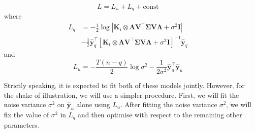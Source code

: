 \begin{equation} \label{eq:LikelihoodParts}
L = L_u + L_q + \text{const}
\end{equation}
where
\begin{equation} \label{eq:Lq}
\begin{split}
L_q &= -\frac{1}{2} \log |\mathbf{K}_t\otimes
\boldsymbol{\Lambda}\mathbf{V}^\top\boldsymbol{\Sigma}\mathbf{V}\boldsymbol{\Lambda}+\sigma^2\mathbf{I}|\\ 
&- \frac{1}{2} \hat{\mathbf{y}}_q^\top \left[\mathbf{K}_t\otimes 
\boldsymbol{\Lambda}\mathbf{V}^\top\boldsymbol{\Sigma}\mathbf{V}\boldsymbol{\Lambda}+\sigma^2\mathbf{I}\right]^{-1} \hat{\mathbf{y}}_q
\end{split}
\end{equation}
and
\begin{equation} \label{eq:Lu}
L_u = -\frac{T(n-q)}{2} \log \sigma^2  -\frac{1}{2\sigma^2} \hat{\mathbf{y}}_u^\top \hat{\mathbf{y}}_u
\end{equation}

Strictly speaking, it is expected to fit both of these models jointly. However, for the shake of illustration, we will use a simpler procedure. First, we will fit the noise variance $\sigma^2$ on $\hat{\mathbf{y}}_u$ alone using $L_u$. After fitting the noise variance $\sigma^2$, we will fix the value of $\sigma^2$ in $L_q$ and then optimise with respect to the remaining other parameters.

